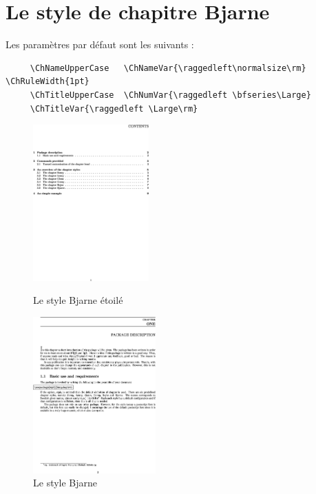 \documentclass{report}
\begin{document}
    \section{Le style de chapitre Bjarne}
    Les paramètres par défaut sont les suivants :
    {\small\begin{verbatim}
     \ChNameUpperCase   \ChNameVar{\raggedleft\normalsize\rm}   \ChRuleWidth{1pt}
     \ChTitleUpperCase  \ChNumVar{\raggedleft \bfseries\Large} 
     \ChTitleVar{\raggedleft \Large\rm}
    \end{verbatim}}
    \begin{figure}[h]
      \begin{minipage}{7 cm}
        \centerline{\includegraphics[height=6cm]{Bjarnes.eps}} 
        \caption{Le style Bjarne \og étoilé \fg{}}
      \end{minipage}\hfill
      \begin{minipage}{7 cm}
        \centerline{\includegraphics[height=6cm]{Bjarne.eps}}
        \caption{Le style Bjarne}
      \end{minipage}\hfill
    \end{figure}
\end{document}
